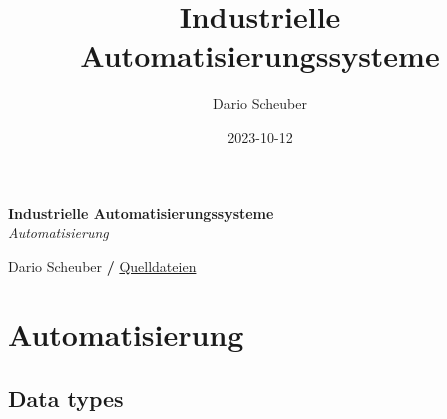 \documentclass[
  10pt,
  a4paper,
]{article}
\title{Industrielle Automatisierungssysteme}
\author{Dario Scheuber}
\date{2023-10-12}
\numberwithin{equation}{section}
\renewcommand*\contentsname{Inhaltsverzeichnis}
\newcommand\contentsname{Inhaltsverzeichnis}
\begin{document}
\begin{center}
  \vspace*{0.5cm}
  
  \textbf{\Huge Industrielle Automatisierungssysteme}\\
  \vspace{0.1cm}
  \textsf{\textit{\large Automatisierung}}
  
  \vspace{0.5cm}
  \textsf{\large Dario
Scheuber \hspace{0.3cm}\textbf{/}\hspace{0.3cm}\large
    \faGithub\space \href{https://github.com/DarioScheuber/summaries-electrical-engineering}{Quelldateien} 
  }
\end{center}

\ifdefined\Shaded\renewenvironment{Shaded}{\begin{tcolorbox}[frame hidden, sharp corners, breakable, colback={codebgcolor}, borderline west={3pt}{0pt}{shadecolor}, boxrule=0pt, enhanced]}{\end{tcolorbox}}\fi

\renewcommand*\contentsname{Inhaltsverzeichnis}
{
\hypersetup{linkcolor=}
\setcounter{tocdepth}{3}
\tableofcontents
}
\hypertarget{automatisierung}{%
\section{Automatisierung}\label{automatisierung}}

\hypertarget{data-types}{%
\subsection{Data types}\label{data-types}}
\end{document}
